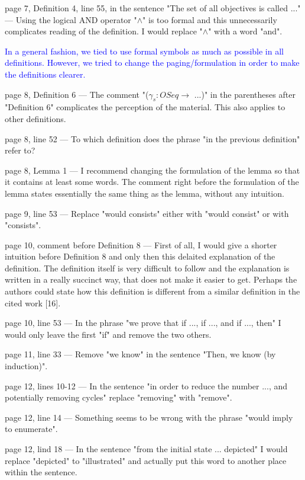\documentclass[11pt]{article}
\newcommand{\ilanswer}[1]{\textcolor{blue}{#1}}
\newcommand{\answer}[1]{\ilanswer{#1}\vspace*{1em}}
\begin{document}
page 7, Definition 4, line 55, in the sentence "The set of all objectives is called ..." ---
Using the logical AND operator "$\land$" is too formal and this unnecessarily complicates reading of the definition.
I would replace "$\land$" with a word "and".

\answer{In a general fashion, we tied to use formal symbols as much as possible in all definitions.
However, we tried to change the paging/formulation in order to make the definitions clearer.}

page 8, Definition 6 ---
The comment "($\gamma_s: OSeq \to$ ...)" in the parentheses after "Definition 6" complicates the perception of the material. This also applies to other definitions.

page 8, line 52 ---
To which definition does the phrase "in the previous definition" refer to?

page 8, Lemma 1 ---
I recommend changing the formulation of the lemma so that it contains at least some words.
The comment right before the formulation of the lemma states essentially the same thing as the lemma, without any intuition.

page 9, line 53 ---
Replace "would consists" either with "would consist" or with "consists".

page 10, comment before Definition 8 ---
First of all, I would give a shorter intuition before Definition 8 and only then this delaited explanation of the definition. The definition itself is very difficult to follow and the explanation is written in a really succinct way, that does not make it easier to get. Perhaps the authors could state how this definition is different from a similar definition in the cited work [16].

page 10, line 53 ---
In the phrase "we prove that if ..., if ..., and if ..., then" I would only leave the first "if" and remove the two others.

page 11, line 33 ---
Remove "we know" in the sentence "Then, we know (by induction)".

page 12, lines 10-12 ---
In the sentence "in order to reduce the number ..., and potentially removing cycles" replace "removing" with "remove".

page 12, line 14 ---
Something seems to be wrong with the phrase "would imply to enumerate".

page 12, lind 18 ---
In the sentence "from the initial state ... depicted" I would replace "depicted" to "illustrated" and actually put this word to another place within the sentence.
\end{document}
